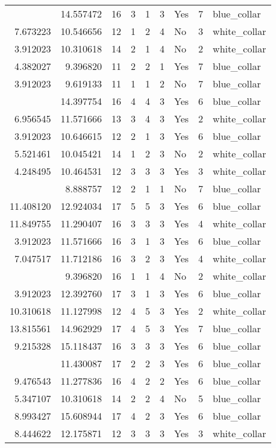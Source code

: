 \documentclass[
]{article}
\begin{document}
\begin{longtable}[t]{rrrrrllrl}
\addlinespace
3.912023 & 14.557472 & 16 & 3 & 1 & 3 & Yes & 7 & blue\_collar\\
7.673223 & 10.546656 & 12 & 1 & 2 & 4 & No & 3 & white\_collar\\
3.912023 & 10.310618 & 14 & 2 & 1 & 4 & No & 2 & white\_collar\\
4.382027 & 9.396820 & 11 & 2 & 2 & 1 & Yes & 7 & blue\_collar\\
3.912023 & 9.619133 & 11 & 1 & 1 & 2 & No & 7 & blue\_collar\\
\addlinespace
15.308426 & 14.397754 & 16 & 4 & 4 & 3 & Yes & 6 & blue\_collar\\
6.956545 & 11.571666 & 13 & 3 & 4 & 3 & Yes & 2 & white\_collar\\
3.912023 & 10.646615 & 12 & 2 & 1 & 3 & Yes & 6 & blue\_collar\\
5.521461 & 10.045421 & 14 & 1 & 2 & 3 & No & 2 & white\_collar\\
4.248495 & 10.464531 & 12 & 3 & 3 & 3 & Yes & 3 & white\_collar\\
\addlinespace
3.912023 & 8.888757 & 12 & 2 & 1 & 1 & No & 7 & blue\_collar\\
11.408120 & 12.924034 & 17 & 5 & 5 & 3 & Yes & 6 & blue\_collar\\
11.849755 & 11.290407 & 16 & 3 & 3 & 3 & Yes & 4 & white\_collar\\
3.912023 & 11.571666 & 16 & 3 & 1 & 3 & Yes & 6 & blue\_collar\\
7.047517 & 11.712186 & 16 & 3 & 2 & 3 & Yes & 4 & white\_collar\\
\addlinespace
3.912023 & 9.396820 & 16 & 1 & 1 & 4 & No & 2 & white\_collar\\
3.912023 & 12.392760 & 17 & 3 & 1 & 3 & Yes & 6 & blue\_collar\\
10.310618 & 11.127998 & 12 & 4 & 5 & 3 & Yes & 2 & white\_collar\\
13.815561 & 14.962929 & 17 & 4 & 5 & 3 & Yes & 7 & blue\_collar\\
9.215328 & 15.118437 & 16 & 3 & 3 & 3 & Yes & 6 & blue\_collar\\
\addlinespace
6.309918 & 11.430087 & 17 & 2 & 2 & 3 & Yes & 6 & blue\_collar\\
9.476543 & 11.277836 & 16 & 4 & 2 & 2 & Yes & 6 & blue\_collar\\
5.347107 & 10.310618 & 14 & 2 & 2 & 4 & No & 5 & blue\_collar\\
8.993427 & 15.608944 & 17 & 4 & 2 & 3 & Yes & 6 & blue\_collar\\
8.444622 & 12.175871 & 12 & 3 & 3 & 3 & Yes & 3 & white\_collar\\

\end{longtable}
\end{document}
